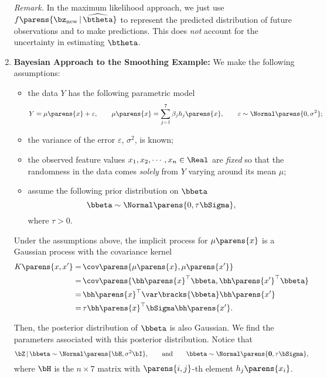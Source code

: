 \documentclass[12pt]{article}
\begin{document}
\begin{enumerate}[label=\textbf{\arabic*.}]
	\textit{Remark.} In the maximum likelihood approach, we just use $f \parens{\bz_{\text{new}} \,\vert\, \widehat{\btheta}}$ to represent the predicted distribution of future observations and to make predictions. This does \emph{not} account for the uncertainty in estimating $\btheta$. 
	
	\item \textbf{Bayesian Approach to the Smoothing Example:} We make the following assumptions: 
	\begin{itemize}
		\item the data $Y$ has the following parametric model 
		\begin{align*}
			Y = \mu \parens{x} + \varepsilon, \hspace{20pt} \mu \parens{x} = \sum_{j=1}^7 \beta_j h_j \parens{x}, \hspace{20pt} \varepsilon \sim \Normal \parens{0, \sigma^2}; 
		\end{align*}
		\item the variance of the error $\varepsilon$, $\sigma^2$, is known; 
		\item the observed feature values $x_1, x_2, \cdots, x_n \in \Real$ are \textit{fixed} so that the randomness in the data comes \textit{solely} from $Y$ varying around its mean $\mu$; 
		\item assume the following prior distribution on $\bbeta$ 
		\begin{equation}\label{priorbeta}
			\bbeta \sim \Normal \parens{0, \tau \bSigma}, 
		\end{equation}
		where $\tau > 0$. 
	\end{itemize}
	Under the assumptions above, the implicit process for $\mu \parens{x}$ is a Gaussian process with the covariance kernel 
	\begin{align*}
		K \parens{x, x'} = & \, \cov \parens{\mu \parens{x}, \mu \parens{x'}} \\ 
		= & \, \cov \parens{\bh \parens{x}^\top \bbeta, \bh \parens{x'}^\top \bbeta} \nonumber \\ 
		= & \, \bh \parens{x}^\top \var \bracks{\bbeta} \bh \parens{x'} \nonumber \\ 
		= & \, \tau \bh \parens{x}^\top \bSigma \bh \parens{x'}. 
	\end{align*}
	
	Then, the posterior distribution of $\bbeta$ is also Gaussian. We find the parameters associated with this posterior distribution. Notice that 
	\begin{equation}
		\bZ \,\vert\, \bbeta \sim \Normal \parens{\bH, \sigma^2 \bI}, \hspace{20pt} \text{and} \hspace{20pt} \bbeta \sim \Normal \parens{\mathbf{0}, \tau \bSigma}, 
	\end{equation}
	where $\bH$ is the $n \times 7$ matrix with $\parens{i, j}$-th element $h_j \parens{x_i}$. 
	

\end{enumerate}
\end{document}
